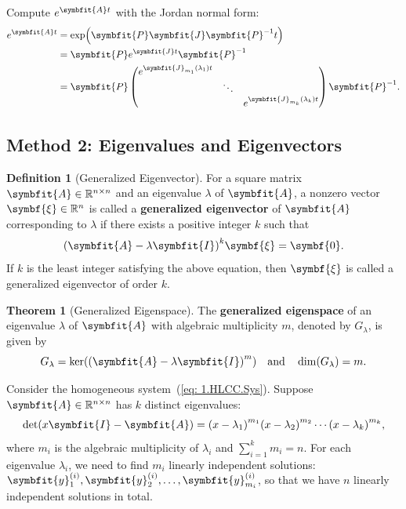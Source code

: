 \documentclass[10pt,UTF8]{article}
\newcommand{\mat}[1]{\symbfit{#1}}
\renewcommand{\vec}[1]{%
  \ifnum0\ifcat#1a1\else0\fi>0
  \symbfit{#1}  %
  \else
  \symbf{#1}  %
  \fi
}
\newenvironment{definitionBox}
{ \bigskip
  \begin{tcolorbox}[colback=blue!5!white,colframe=blue!75!black,parbox=false,before
  upper=\par,before lower=\par]}
  {
\end{tcolorbox}}
\newenvironment{theoremBox}
{ \bigskip
  \begin{tcolorbox}[colback=yellow!5!white,colframe=yellow!75!black,parbox=false,before
  upper=\par,before lower=\par]}
  {
\end{tcolorbox}}
\theoremstyle{definition}
\newtheorem{definition inner}{Definition}[section]
\newenvironment{definition}[1][]
{
  \begin{definitionBox}
  \begin{definition inner}[#1]\hfill\par}
    {
    \end{definition inner}
\end{definitionBox}}
\theoremstyle{definition}
\newtheorem{theorem inner}{Theorem}[section]
\newenvironment{theorem}[1][]
{
  \begin{theoremBox}
  \begin{theorem inner}[#1]\hfill\par}
    {
    \end{theorem inner}
\end{theoremBox}}
\theoremstyle{definition}
\newtheorem*{proof inner}{\textit{Proof}}
\theoremstyle{plain}
\newtheorem{tip inner}{Tip}[section]
\theoremstyle{remark}
\begin{document}
Compute \(e^{\mat{A} t}\) with the Jordan normal form:
\begin{align*}
  e^{\mat{A} t} &= \exp(\mat{P} \mat{J} \mat{P}^{-1} t) \\
  &= \mat{P} e^{\mat{J} t} \mat{P}^{-1} \\
  &= \mat{P}
  \begin{pmatrix}
    e^{\mat{J}_{m_1}(\lambda_1) t} & & \\ & \ddots & \\ & &
    e^{\mat{J}_{m_k}(\lambda_k) t}
  \end{pmatrix}
  \mat{P}^{-1}.
\end{align*}

\subsection{Method 2: Eigenvalues and Eigenvectors}

\begin{definition}[Generalized Eigenvector]
  {}\label{def: Generalized Eigenvector}
  For a square matrix \(\mat{A} \in \mathbb{R}^{n \times n}\) and an eigenvalue
  \(\lambda \) of \(\mat{A}\), a nonzero vector \(\vec{\xi} \in \mathbb{R}^n\)
  is called a \textbf{generalized eigenvector} of \(\mat{A}\) corresponding to
  \(\lambda \) if there exists a positive integer \(k\) such that
  \begin{equation*}
    {(\mat{A} - \lambda \mat{I})}^k \vec{\xi} = \vec{0}.
  \end{equation*}
  If \(k\) is the least integer satisfying the above equation,
  then \(\vec{\xi}\) is called
  a generalized eigenvector of order \(k\).
\end{definition}

\begin{theorem}[Generalized Eigenspace]
  {}\label{thm: Generalized Eigenspace}
  The \textbf{generalized eigenspace} of
  an eigenvalue \( \lambda \) of \(\mat{A}\) with algebraic multiplicity \(m\),
  denoted by \(G_{\lambda}\), is given by
  \begin{equation*}
    G_{\lambda} = \ker \! \qty({(\mat{A} - \lambda \mat{I})}^m)
    \qand
    \dim(G_{\lambda}) = m.
  \end{equation*}
\end{theorem}


Consider the homogeneous system~(\ref{eq: 1.HLCC.Sys}).
Suppose \(\mat{A} \in \mathbb{R}^{n \times n}\) has \(k\) distinct eigenvalues:
\begin{equation*}
  \det(x\mat{I} - \mat{A}) =
  {(x - \lambda_1)}^{m_1} {(x - \lambda_2)}^{m_2}
  \cdots {(x - \lambda_k)}^{m_k},
\end{equation*}
where \(m_i\) is the algebraic multiplicity of \(\lambda_i\) and
\(\sum_{i=1}^k m_i = n\).
For each eigenvalue \(\lambda_i\), we need to find \(m_i\) linearly
independent solutions:
\( \vec{y}^{(i)}_1, \vec{y}^{(i)}_2, \ldots, \vec{y}^{(i)}_{m_i} \),
so that we have \(n\) linearly independent solutions in total.
\end{document}
